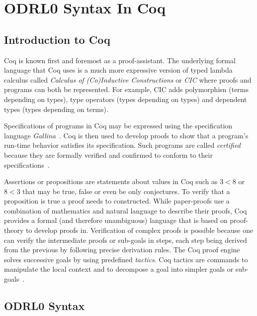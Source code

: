 \chapter{ODRL0 Syntax In Coq}

\section{Introduction to Coq}

Coq is known first and foremost as a proof-assistant. The underlying formal language that Coq uses is a much more expressive version of typed lambda calculus called \emph{Calculus of (Co)Inductive Constructions} or \emph{CIC} where proofs and programs can both be represented. For example, CIC adds polymorphisn (terms depending on types), type operators (types depending on types) and dependent types (types depending on terms).

Specifications of programs in Coq may be expressed using the specification language \emph{Gallina}~\cite{gallinaref}. Coq is then used to develop proofs to show that a program's run-time behavior satisfies its specification. Such programs are called \emph{certified} because they are formally verified and confirmed to conform to their specifications~\cite{BC04}.

Assertions or propositions are statements about values in Coq such as $3<8$ or $8<3$ that may be true, false or even be only conjectures. To verify that a proposition is true a proof needs to constructed. While paper-proofs use a combination of mathematics and natural language to describe their proofs, Coq provides a formal (and therefore unambiguous) language that is based on proof-theory to develop proofs in. Verification of complex proofs is possible because one can verify the intermediate proofs or sub-goals in steps, each step being derived from the previous by following precise derivation rules. The Coq proof engine solves successive goals by using predefined \emph{tactics}. Coq tactics are commands to manipulate the local context and to decompose a goal into simpler goals or sub-goals~\cite{BC04}.

\section{ODRL0 Syntax}

